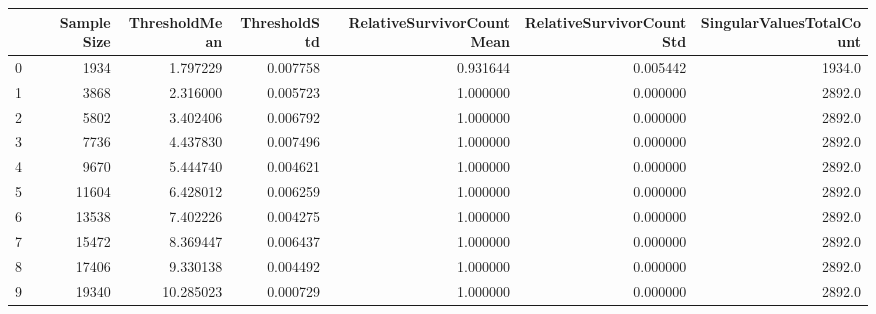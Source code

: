 \begin{tabular}{lrrrrrr}
\toprule
{} &  Sample Size &  ThresholdMean &  ThresholdStd &  RelativeSurvivorCountMean &  RelativeSurvivorCountStd &  SingularValuesTotalCount \\
\midrule
0 &         1934 &       1.797229 &      0.007758 &                   0.931644 &                  0.005442 &                    1934.0 \\
1 &         3868 &       2.316000 &      0.005723 &                   1.000000 &                  0.000000 &                    2892.0 \\
2 &         5802 &       3.402406 &      0.006792 &                   1.000000 &                  0.000000 &                    2892.0 \\
3 &         7736 &       4.437830 &      0.007496 &                   1.000000 &                  0.000000 &                    2892.0 \\
4 &         9670 &       5.444740 &      0.004621 &                   1.000000 &                  0.000000 &                    2892.0 \\
5 &        11604 &       6.428012 &      0.006259 &                   1.000000 &                  0.000000 &                    2892.0 \\
6 &        13538 &       7.402226 &      0.004275 &                   1.000000 &                  0.000000 &                    2892.0 \\
7 &        15472 &       8.369447 &      0.006437 &                   1.000000 &                  0.000000 &                    2892.0 \\
8 &        17406 &       9.330138 &      0.004492 &                   1.000000 &                  0.000000 &                    2892.0 \\
9 &        19340 &      10.285023 &      0.000729 &                   1.000000 &                  0.000000 &                    2892.0 \\
\bottomrule
\end{tabular}

